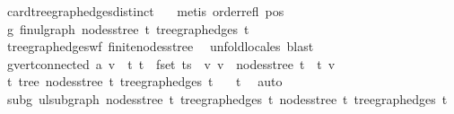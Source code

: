 \begin{isabellebody}
\ card{\isacharunderscore}{\kern0pt}tree{\isacharunderscore}{\kern0pt}graph{\isacharunderscore}{\kern0pt}edges{\isacharunderscore}{\kern0pt}distinct\ {}\ \isamarkupfalse%
\ {\isacharparenleft}{\kern0pt}metis\ order{\isacharunderscore}{\kern0pt}refl\ pos{}{\isacharparenright}{\kern0pt}\isanewline
\ \ \isamarkupfalse%
\ \isamarkupfalse%
\ g{\isacharcolon}{\kern0pt}\ fin{\isacharunderscore}{\kern0pt}ulgraph\ {\isachardoublequoteopen}nodes{\isacharunderscore}{\kern0pt}stree\ {\isacharquery}{\kern0pt}t{\isachardoublequoteclose}\ {\isachardoublequoteopen}tree{\isacharunderscore}{\kern0pt}graph{\isacharunderscore}{\kern0pt}edges\ {\isacharquery}{\kern0pt}t{\isachardoublequoteclose}\ \isamarkupfalse%
\ tree{\isacharunderscore}{\kern0pt}graph{\isacharunderscore}{\kern0pt}edges{\isacharunderscore}{\kern0pt}wf\ finite{\isacharunderscore}{\kern0pt}nodes{\isacharunderscore}{\kern0pt}stree\ \isamarkupfalse%
\ {\isacharparenleft}{\kern0pt}unfold{\isacharunderscore}{\kern0pt}locales{\isacharparenright}{\kern0pt}\ blast{\isacharplus}{\kern0pt}\isanewline
\ \ \isamarkupfalse%
\ {\isachardoublequoteopen}g{\isachardot}{\kern0pt}vert{\isacharunderscore}{\kern0pt}connected\ a\ v{\isachardoublequoteclose}\ \ t{\isacharcolon}{\kern0pt}\ {\isachardoublequoteopen}t\ {\isasymin}\ fset\ ts{\isachardoublequoteclose}\ \ v{\isacharcolon}{\kern0pt}\ {\isachardoublequoteopen}v\ {\isasymin}\ nodes{\isacharunderscore}{\kern0pt}stree\ t{\isachardoublequoteclose}\ \ t\ v\isanewline
\ \ \isamarkupfalse%
{\isacharminus}{\kern0pt}\isanewline
\ \ \ \ \isamarkupfalse%
\ t{\isacharcolon}{\kern0pt}\ tree\ {\isachardoublequoteopen}nodes{\isacharunderscore}{\kern0pt}stree\ t{\isachardoublequoteclose}\ {\isachardoublequoteopen}tree{\isacharunderscore}{\kern0pt}graph{\isacharunderscore}{\kern0pt}edges\ t{\isachardoublequoteclose}\ \isamarkupfalse%
\ {}\ t\ \isamarkupfalse%
\ auto\isanewline
\ \ \ \ \isamarkupfalse%
\ subg{\isacharcolon}{\kern0pt}\ ulsubgraph\ {\isachardoublequoteopen}nodes{\isacharunderscore}{\kern0pt}stree\ t{\isachardoublequoteclose}\ {\isachardoublequoteopen}tree{\isacharunderscore}{\kern0pt}graph{\isacharunderscore}{\kern0pt}edges\ t{\isachardoublequoteclose}\ {\isachardoublequoteopen}nodes{\isacharunderscore}{\kern0pt}stree\ {\isacharquery}{\kern0pt}t{\isachardoublequoteclose}\ {\isachardoublequoteopen}tree{\isacharunderscore}{\kern0pt}graph{\isacharunderscore}{\kern0pt}edges\ {\isacharquery}{\kern0pt}t{\isachardoublequoteclose}\ \isamarkupfalse%

\end{isabellebody}
